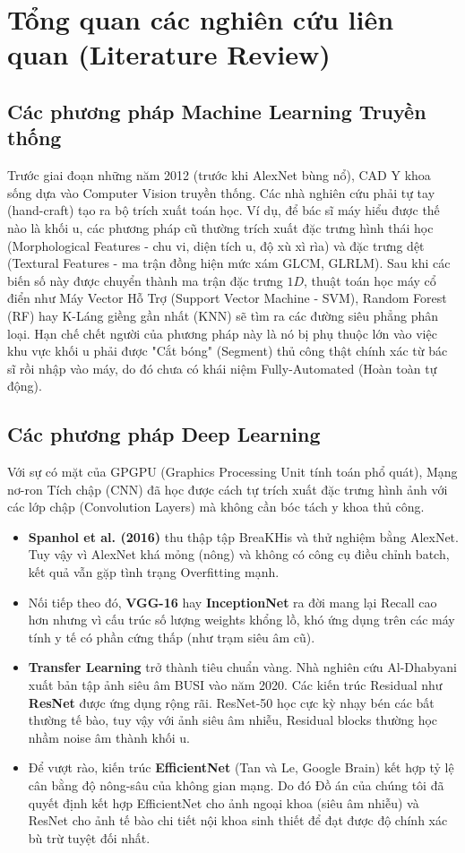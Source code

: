 \documentclass[conference,a4paper]{IEEEtran}
\begin{document}
\section{Tổng quan các nghiên cứu liên quan (Literature Review)}
\subsection{Các phương pháp Machine Learning Truyền thống}
Trước giai đoạn những năm 2012 (trước khi AlexNet bùng nổ), CAD Y khoa sống dựa vào Computer Vision truyền thống. Các nhà nghiên cứu phải tự tay (hand-craft) tạo ra bộ trích xuất toán học.
Ví dụ, để bác sĩ máy hiểu được thế nào là khối u, các phương pháp cũ thường trích xuất đặc trưng hình thái học (Morphological Features - chu vi, diện tích u, độ xù xì rìa) và đặc trưng dệt (Textural Features - ma trận đồng hiện mức xám GLCM, GLRLM). Sau khi các biến số này được chuyển thành ma trận đặc trưng $1D$, thuật toán học máy cổ điển như Máy Vector Hỗ Trợ (Support Vector Machine - SVM), Random Forest (RF) hay K-Láng giềng gần nhất (KNN) sẽ tìm ra các đường siêu phẳng phân loại. Hạn chế chết người của phương pháp này là nó bị phụ thuộc lớn vào việc khu vực khối u phải được "Cắt bóng" (Segment) thủ công thật chính xác từ bác sĩ rồi nhập vào máy, do đó chưa có khái niệm Fully-Automated (Hoàn toàn tự động).

\subsection{Các phương pháp Deep Learning}
Với sự có mặt của GPGPU (Graphics Processing Unit tính toán phổ quát), Mạng nơ-ron Tích chập (CNN) đã học được cách tự trích xuất đặc trưng hình ảnh với các lớp chập (Convolution Layers) mà không cần bóc tách y khoa thủ công.
\begin{itemize}
\item \textbf{Spanhol et al. (2016)} \cite{breakhis} thu thập tập BreaKHis và thử nghiệm bằng AlexNet. Tuy vậy vì AlexNet khá mỏng (nông) và không có công cụ điều chỉnh batch, kết quả vẫn gặp tình trạng Overfitting mạnh.
\item Nối tiếp theo đó, \textbf{VGG-16} hay \textbf{InceptionNet} ra đời mang lại Recall cao hơn nhưng vì cấu trúc số lượng weights khổng lồ, khó ứng dụng trên các máy tính y tế có phần cứng thấp (như trạm siêu âm cũ).
\item \textbf{Transfer Learning} trở thành tiêu chuẩn vàng. Nhà nghiên cứu Al-Dhabyani \cite{busi} xuất bản tập ảnh siêu âm BUSI vào năm 2020. Các kiến trúc Residual như \textbf{ResNet} được ứng dụng rộng rãi. ResNet-50 học cực kỳ nhạy bén các bất thường tế bào, tuy vậy với ảnh siêu âm nhiễu, Residual blocks thường học nhầm noise âm thành khối u.
\item Để vượt rào, kiến trúc \textbf{EfficientNet} (Tan và Le, Google Brain) kết hợp tỷ lệ cân bằng độ nông-sâu của không gian mạng. Do đó Đồ án của chúng tôi đã quyết định kết hợp EfficientNet cho ảnh ngoại khoa (siêu âm nhiễu) và ResNet cho ảnh tế bào chi tiết nội khoa sinh thiết để đạt được độ chính xác bù trừ tuyệt đối nhất.
\end{itemize}
\end{document}
